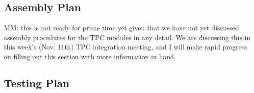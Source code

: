 \subsection{Assembly Plan}

MM: this is not ready for prime time yet given that we have not yet discussed assembly procedures for the TPC modules in any detail.  We are discussing this in this week's (Nov. 11th) TPC integration meeting, and I will make rapid progress on filling out this section with more information in hand.

\subsection{Testing Plan}







